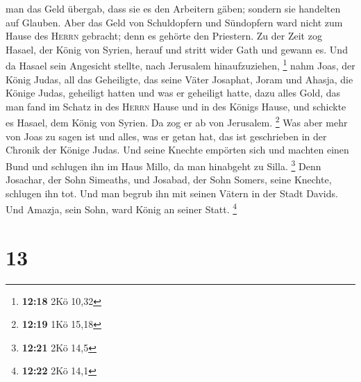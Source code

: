man das Geld übergab, dass sie es den Arbeitern gäben; sondern sie
handelten auf Glauben.  Aber das Geld von Schuldopfern
und Sündopfern ward nicht zum Hause des \textsc{Herrn} gebracht; denn es
gehörte den Priestern.  Zu der Zeit zog Hasael, der König
von Syrien, herauf und stritt wider Gath und gewann es. Und da Hasael
sein Angesicht stellte, nach Jerusalem hinaufzuziehen, \footnote{\textbf{12:18}
  2Kö 10,32}  nahm Joas, der König Judas, all das
Geheiligte, das seine Väter Josaphat, Joram und Ahasja, die Könige
Judas, geheiligt hatten und was er geheiligt hatte, dazu alles Gold, das
man fand im Schatz in des \textsc{Herrn} Hause und in des Königs Hause,
und schickte es Hasael, dem König von Syrien. Da zog er ab von
Jerusalem. \footnote{\textbf{12:19} 1Kö 15,18}  Was aber
mehr von Joas zu sagen ist und alles, was er getan hat, das ist
geschrieben in der Chronik der Könige Judas.  Und seine
Knechte empörten sich und machten einen Bund und schlugen ihn im Haus
Millo, da man hinabgeht zu Silla. \footnote{\textbf{12:21} 2Kö 14,5}
 Denn Josachar, der Sohn Simeaths, und Josabad, der Sohn
Somers, seine Knechte, schlugen ihn tot. Und man begrub ihn mit seinen
Vätern in der Stadt Davids. Und Amazja, sein Sohn, ward König an seiner
Statt. \footnote{\textbf{12:22} 2Kö 14,1}

\hypertarget{section-3}{%
\section{13}\label{section-3}}


